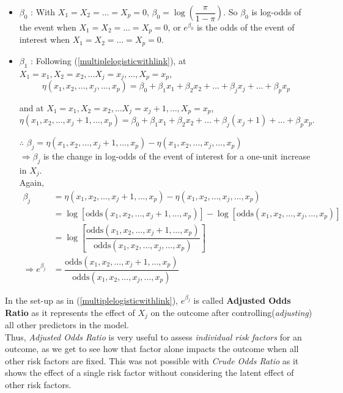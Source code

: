 \documentclass[11pt, a4paper]{article}
\begin{document}
\begin{itemize}
\item $\beta_0$ : With $X_1 = X_2 = \ldots = X_p = 0$, $\beta_0 = \log \left( \dfrac{\pi}{1 - \pi} \right)$. So $\beta_0$ is log-odds of the event when $X_1 = X_2 = \ldots = X_p = 0$, or $e^{\beta_0}$ is the odds of the event of interest when $X_1 = X_2 = \ldots = X_p = 0$.

\item $\beta_1$ : Following (\ref{multiplelogisticwithlink}), at $X_1 = x_1, X_2 = x_2, \ldots X_j = x_j, \ldots, X_p = x_p$, 
$$\eta(x_1, x_2, \ldots, x_j, \ldots, x_p) = \beta_0 + \beta_1 x_1 + \beta_2 x_2 + \ldots + \beta_j x_j + \ldots + \beta_p x_p$$

and at $X_1 = x_1, X_2 = x_2, \ldots X_j = x_j+1, \ldots, X_p = x_p$, 
$$\eta(x_1, x_2, \ldots, x_j+1, \ldots, x_p) = \beta_0 + \beta_1 x_1 + \beta_2 x_2 + \ldots + \beta_j (x_j+1) + \ldots + \beta_p x_p.$$

$\therefore$ $\beta_j = \eta(x_1, x_2, \ldots, x_j+1, \ldots, x_p) - \eta(x_1, x_2, \ldots, x_j, \ldots, x_p)$ \\[0.1em]

$ \Rightarrow \beta_j$ is the change in log-odds of the event of interest for a one-unit increase in $X_j$. \\[0.15em]

Again,
\begin{align*}
\beta_j &= \eta(x_1, x_2, \ldots, x_j+1, \ldots, x_p) - \eta(x_1, x_2, \ldots, x_j, \ldots, x_p) \\[0.5em]
&= \log [\text{odds}(x_1, x_2, \ldots, x_j+1, \ldots, x_p)] - \log [\text{odds}(x_1, x_2, \ldots, x_j, \ldots, x_p)] \\[0.5em]
&= \log \left[ \dfrac{\text{odds}(x_1, x_2, \ldots, x_j+1, \ldots, x_p)}{\text{odds}(x_1, x_2, \ldots, x_j, \ldots, x_p)} \right] \\[0.5em]
\Rightarrow e^{\beta_j} &= \dfrac{\text{odds}(x_1, x_2, \ldots, x_j+1, \ldots, x_p)}{\text{odds}(x_1, x_2, \ldots, x_j, \ldots, x_p)}
\end{align*}
\end{itemize}

In the set-up as in (\ref{multiplelogisticwithlink}), $e^{\beta_j}$ is called \textbf{Adjusted Odds Ratio} as it represents the effect of $X_j$ on the outcome after controlling(\textit{adjusting}) all other predictors in the model. \\[0.15em]

Thus, \textit{Adjusted Odds Ratio} is very useful to assess \textit{individual risk factors} for an outcome, as we get to see how that factor alone impacts the outcome when all other risk factors are fixed. This was not possible with \textit{Crude Odds Ratio} as it shows the effect of a single risk factor without considering the latent effect of other risk factors. \\[0.15em]
\end{document}
